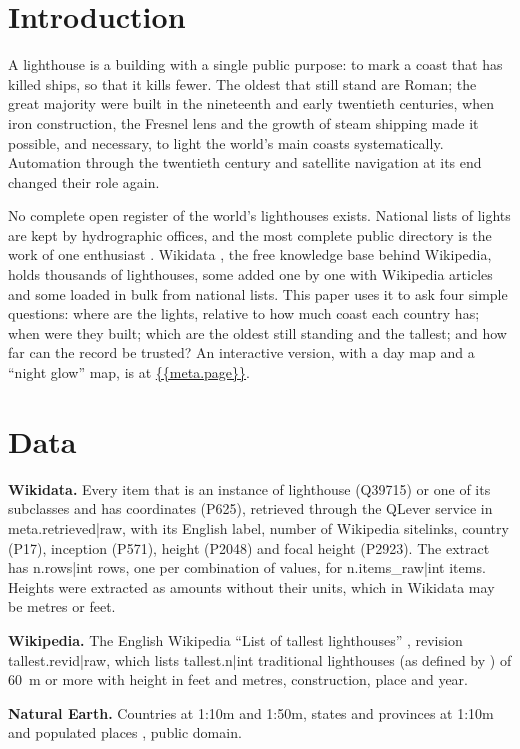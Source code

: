 \documentclass[11pt,a4paper]{article}
\begin{document}
\section{Introduction}
A lighthouse is a building with a single public purpose: to mark a coast that has killed ships, so that it kills fewer. The oldest that still stand are Roman; the great majority were built in the nineteenth and early twentieth centuries, when iron construction, the Fresnel lens and the growth of steam shipping made it possible, and necessary, to light the world's main coasts systematically. Automation through the twentieth century and satellite navigation at its end changed their role again.

No complete open register of the world's lighthouses exists. National lists of lights are kept by hydrographic offices, and the most complete public directory is the work of one enthusiast \citep{rowlett}. Wikidata \citep{wikidata}, the free knowledge base behind Wikipedia, holds thousands of lighthouses, some added one by one with Wikipedia articles and some loaded in bulk from national lists. This paper uses it to ask four simple questions: where are the lights, relative to how much coast each country has; when were they built; which are the oldest still standing and the tallest; and how far can the record be trusted? An interactive version, with a day map and a ``night glow'' map, is at \url{{{meta.page}}}.

\section{Data}
\textbf{Wikidata.} Every item that is an instance of lighthouse (Q39715) or one of its subclasses and has coordinates (P625), retrieved through the QLever service in {{meta.retrieved|raw}}, with its English label, number of Wikipedia sitelinks, country (P17), inception (P571), height (P2048) and focal height (P2923). The extract has {{n.rows|int}} rows, one per combination of values, for {{n.items_raw|int}} items. Heights were extracted as amounts without their units, which in Wikidata may be metres or feet.

\textbf{Wikipedia.} The English Wikipedia ``List of tallest lighthouses'' \citep{wikitall}, revision {{tallest.revid|raw}}, which lists {{tallest.n|int}} traditional lighthouses (as defined by \citealt{rowlett}) of 60~m or more with height in feet and metres, construction, place and year.

\textbf{Natural Earth.} Countries at 1:10m and 1:50m, states and provinces at 1:10m and populated places \citep{naturalearth}, public domain.
\end{document}
